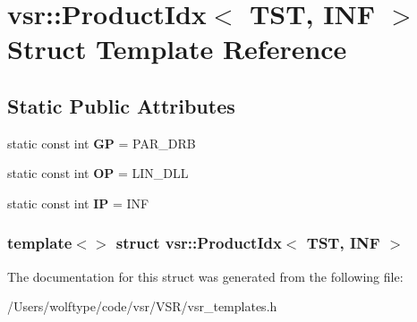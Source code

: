 \hypertarget{structvsr_1_1_product_idx_3_01_t_s_t_00_01_i_n_f_01_4}{\section{vsr\-:\-:Product\-Idx$<$ T\-S\-T, I\-N\-F $>$ Struct Template Reference}
\label{structvsr_1_1_product_idx_3_01_t_s_t_00_01_i_n_f_01_4}
}
\subsection*{Static Public Attributes}
\begin{DoxyCompactItemize}
\item 
\hypertarget{structvsr_1_1_product_idx_3_01_t_s_t_00_01_i_n_f_01_4_a3b6e8e5d4059d50b4a75c718260e9601}{static const int {\bfseries G\-P} = P\-A\-R\-\_\-\-D\-R\-B}\label{structvsr_1_1_product_idx_3_01_t_s_t_00_01_i_n_f_01_4_a3b6e8e5d4059d50b4a75c718260e9601}

\item 
\hypertarget{structvsr_1_1_product_idx_3_01_t_s_t_00_01_i_n_f_01_4_a40827b3d8bee0e0d0fc53753ccb62ae3}{static const int {\bfseries O\-P} = L\-I\-N\-\_\-\-D\-L\-L}\label{structvsr_1_1_product_idx_3_01_t_s_t_00_01_i_n_f_01_4_a40827b3d8bee0e0d0fc53753ccb62ae3}

\item 
\hypertarget{structvsr_1_1_product_idx_3_01_t_s_t_00_01_i_n_f_01_4_aecfddf54a60635805ebc70d2517fd829}{static const int {\bfseries I\-P} = I\-N\-F}\label{structvsr_1_1_product_idx_3_01_t_s_t_00_01_i_n_f_01_4_aecfddf54a60635805ebc70d2517fd829}

\end{DoxyCompactItemize}
\subsubsection*{template$<$$>$ struct vsr\-::\-Product\-Idx$<$ T\-S\-T, I\-N\-F $>$}



The documentation for this struct was generated from the following file\-:\begin{DoxyCompactItemize}
\item 
/\-Users/wolftype/code/vsr/\-V\-S\-R/vsr\-\_\-templates.\-h\end{DoxyCompactItemize}
